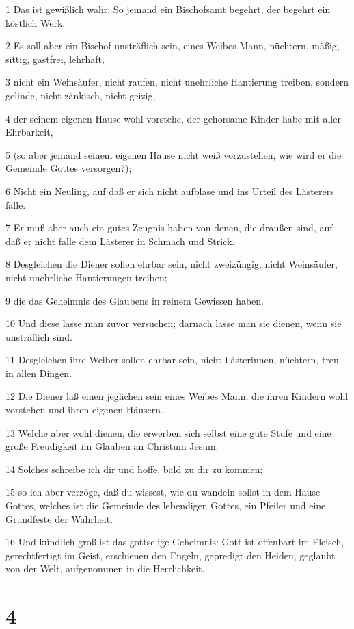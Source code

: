 \par 1 Das ist gewißlich wahr: So jemand ein Bischofsamt begehrt, der begehrt ein köstlich Werk.
\par 2 Es soll aber ein Bischof unsträflich sein, eines Weibes Mann, nüchtern, mäßig, sittig, gastfrei, lehrhaft,
\par 3 nicht ein Weinsäufer, nicht raufen, nicht unehrliche Hantierung treiben, sondern gelinde, nicht zänkisch, nicht geizig,
\par 4 der seinem eigenen Hause wohl vorstehe, der gehorsame Kinder habe mit aller Ehrbarkeit,
\par 5 (so aber jemand seinem eigenen Hause nicht weiß vorzustehen, wie wird er die Gemeinde Gottes versorgen?);
\par 6 Nicht ein Neuling, auf daß er sich nicht aufblase und ins Urteil des Lästerers falle.
\par 7 Er muß aber auch ein gutes Zeugnis haben von denen, die draußen sind, auf daß er nicht falle dem Lästerer in Schmach und Strick.
\par 8 Desgleichen die Diener sollen ehrbar sein, nicht zweizüngig, nicht Weinsäufer, nicht unehrliche Hantierungen treiben;
\par 9 die das Geheimnis des Glaubens in reinem Gewissen haben.
\par 10 Und diese lasse man zuvor versuchen; darnach lasse man sie dienen, wenn sie unsträflich sind.
\par 11 Desgleichen ihre Weiber sollen ehrbar sein, nicht Lästerinnen, nüchtern, treu in allen Dingen.
\par 12 Die Diener laß einen jeglichen sein eines Weibes Mann, die ihren Kindern wohl vorstehen und ihren eigenen Häusern.
\par 13 Welche aber wohl dienen, die erwerben sich selbst eine gute Stufe und eine große Freudigkeit im Glauben an Christum Jesum.
\par 14 Solches schreibe ich dir und hoffe, bald zu dir zu kommen;
\par 15 so ich aber verzöge, daß du wissest, wie du wandeln sollst in dem Hause Gottes, welches ist die Gemeinde des lebendigen Gottes, ein Pfeiler und eine Grundfeste der Wahrheit.
\par 16 Und kündlich groß ist das gottselige Geheimnis: Gott ist offenbart im Fleisch, gerechtfertigt im Geist, erschienen den Engeln, gepredigt den Heiden, geglaubt von der Welt, aufgenommen in die Herrlichkeit.

\chapter{4}

